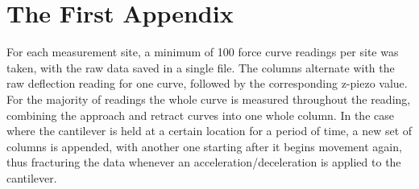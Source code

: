 \chapter{The First Appendix}

For each measurement site, a minimum of 100 force curve readings per site was taken, with the raw data saved in a single file. The columns alternate with the raw deflection reading for one curve, followed by the corresponding z-piezo value. For the majority of readings the whole curve is measured throughout the reading, combining the approach and retract curves into one whole column. In the case where the cantilever is held at a certain location for a period of time, a new set of columns is appended, with another one starting after it begins movement again, thus fracturing the data whenever an acceleration/deceleration is applied to the cantilever.
